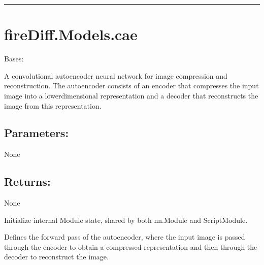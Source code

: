 \documentclass[a4paper,10pt,english]{sphinxmanual}
\begin{document}
\bigskip\hrule\bigskip



\section{fireDiff.Models.cae}
\label{\detokenize{models:module-fireDiff.Models.cae}}\label{\detokenize{models:firediff-models-cae}}

\begin{fulllineitems}
\label{\detokenize{models:fireDiff.Models.cae.Autoencoder}}
\pysigstartsignatures
{}
\pysigstopsignatures
\sphinxAtStartPar
Bases: 

\sphinxAtStartPar
A convolutional autoencoder neural network for image compression and
reconstruction.
The autoencoder consists of an encoder that compresses the input image
into a lower\sphinxhyphen{}dimensional representation and a decoder that reconstructs
the image from this representation.


\subsection{Parameters:}
\label{\detokenize{models:id40}}
\sphinxAtStartPar
None


\subsection{Returns:}
\label{\detokenize{models:id41}}
\sphinxAtStartPar
None

\sphinxAtStartPar
Initialize internal Module state, shared by both nn.Module and ScriptModule.

\begin{fulllineitems}
\label{\detokenize{models:fireDiff.Models.cae.Autoencoder.forward}}
\pysigstartsignatures
{}
\pysigstopsignatures
\sphinxAtStartPar
Defines the forward pass of the autoencoder, where the input image
is passed through the encoder to obtain a compressed representation
and then through the decoder to reconstruct the image.



\end{fulllineitems}
\end{fulllineitems}
\end{document}
